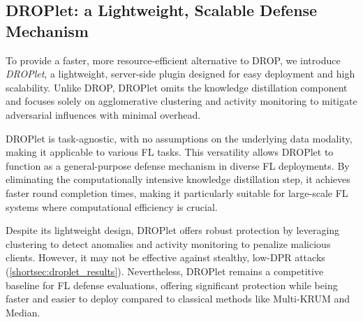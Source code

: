 
\subsection{DROPlet: a Lightweight, Scalable Defense Mechanism}  
\label{subsec:droplet}  

To provide a faster, more resource-efficient alternative to DROP, we introduce \textit{DROPlet}, a lightweight, server-side plugin designed for easy deployment and high scalability.
Unlike DROP, DROPlet omits the knowledge distillation component and focuses solely on agglomerative clustering and activity monitoring to mitigate adversarial influences with minimal overhead.  

DROPlet is task-agnostic, with no assumptions on the underlying data modality, making it applicable to various FL tasks. This versatility allows DROPlet to function as a general-purpose defense mechanism in diverse FL deployments. By eliminating the computationally intensive knowledge distillation step, it achieves faster round completion times, making it particularly suitable for large-scale FL systems where computational efficiency is crucial.  

Despite its lightweight design, DROPlet offers robust protection by leveraging clustering to detect anomalies and activity monitoring to penalize malicious clients. However, it may not be effective against stealthy, low-DPR attacks (\cref{shortsec:droplet_results}).
Nevertheless, DROPlet remains a competitive baseline for FL defense evaluations, offering significant protection while being faster and easier to deploy compared to classical methods like Multi-KRUM and Median. 
